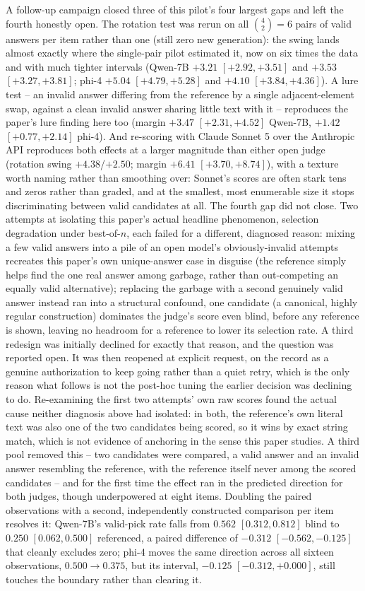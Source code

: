 \documentclass[11pt]{article}
\begin{document}
A follow-up campaign closed three of this pilot's four largest gaps and left the fourth honestly open. The rotation test was rerun on all $\binom{4}{2}=6$ pairs of valid answers per item rather than one (still zero new generation): the swing lands almost exactly where the single-pair pilot estimated it, now on six times the data and with much tighter intervals (Qwen-7B $+3.21$ $[+2.92,+3.51]$ and $+3.53$ $[+3.27,+3.81]$; phi-4 $+5.04$ $[+4.79,+5.28]$ and $+4.10$ $[+3.84,+4.36]$). A lure test -- an invalid answer differing from the reference by a single adjacent-element swap, against a clean invalid answer sharing little text with it -- reproduces the paper's lure finding here too (margin $+3.47$ $[+2.31,+4.52]$ Qwen-7B, $+1.42$ $[+0.77,+2.14]$ phi-4). And re-scoring with Claude Sonnet 5 over the Anthropic API reproduces both effects at a larger magnitude than either open judge (rotation swing $+4.38$/$+2.50$; margin $+6.41$ $[+3.70,+8.74]$), with a texture worth naming rather than smoothing over: Sonnet's scores are often stark tens and zeros rather than graded, and at the smallest, most enumerable size it stops discriminating between valid candidates at all. The fourth gap did not close. Two attempts at isolating this paper's actual headline phenomenon, selection degradation under best-of-$n$, each failed for a different, diagnosed reason: mixing a few valid answers into a pile of an open model's obviously-invalid attempts recreates this paper's own unique-answer case in disguise (the reference simply helps find the one real answer among garbage, rather than out-competing an equally valid alternative); replacing the garbage with a second genuinely valid answer instead ran into a structural confound, one candidate (a canonical, highly regular construction) dominates the judge's score even blind, before any reference is shown, leaving no headroom for a reference to lower its selection rate. A third redesign was initially declined for exactly that reason, and the question was reported open. It was then reopened at explicit request, on the record as a genuine authorization to keep going rather than a quiet retry, which is the only reason what follows is not the post-hoc tuning the earlier decision was declining to do. Re-examining the first two attempts' own raw scores found the actual cause neither diagnosis above had isolated: in both, the reference's own literal text was also one of the two candidates being scored, so it wins by exact string match, which is not evidence of anchoring in the sense this paper studies. A third pool removed this -- two candidates were compared, a valid answer and an invalid answer resembling the reference, with the reference itself never among the scored candidates -- and for the first time the effect ran in the predicted direction for both judges, though underpowered at eight items. Doubling the paired observations with a second, independently constructed comparison per item resolves it: Qwen-7B's valid-pick rate falls from $0.562$ $[0.312,0.812]$ blind to $0.250$ $[0.062,0.500]$ referenced, a paired difference of $-0.312$ $[-0.562,-0.125]$ that cleanly excludes zero; phi-4 moves the same direction across all sixteen observations, $0.500\to0.375$, but its interval, $-0.125$ $[-0.312,+0.000]$, still touches the boundary rather than clearing it. 
\end{document}

